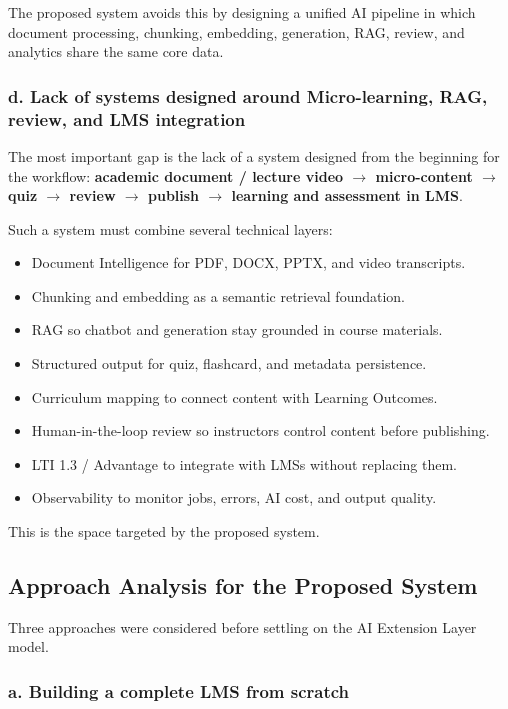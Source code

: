 The proposed system avoids this by designing a unified AI pipeline in which
document processing, chunking, embedding, generation, RAG, review, and
analytics share the same core data.

\subsubsection*{d. Lack of systems designed around Micro-learning, RAG, review, and LMS integration}

The most important gap is the lack of a system designed from the beginning for
the workflow: \textbf{academic document / lecture video $\rightarrow$
micro-content $\rightarrow$ quiz $\rightarrow$ review $\rightarrow$ publish
$\rightarrow$ learning and assessment in LMS}.

Such a system must combine several technical layers:

\begin{itemize}
    \item Document Intelligence for PDF, DOCX, PPTX, and video transcripts.
    \item Chunking and embedding as a semantic retrieval foundation.
    \item RAG so chatbot and generation stay grounded in course materials.
    \item Structured output for quiz, flashcard, and metadata persistence.
    \item Curriculum mapping to connect content with Learning Outcomes.
    \item Human-in-the-loop review so instructors control content before
          publishing.
    \item LTI 1.3 / Advantage to integrate with LMSs without replacing them.
    \item Observability to monitor jobs, errors, AI cost, and output quality.
\end{itemize}

This is the space targeted by the proposed system.

\subsection{Approach Analysis for the Proposed System}

Three approaches were considered before settling on the AI Extension
Layer model.

\subsubsection*{a. Building a complete LMS from scratch}

